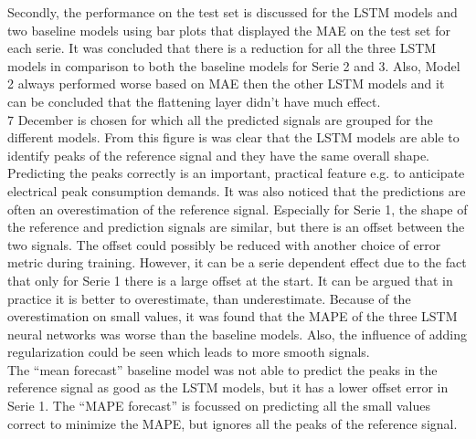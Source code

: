  Secondly, the performance on the test set is discussed for the LSTM models and two baseline models using bar plots that displayed the MAE on the test set for each serie. It was concluded that there is a reduction for all the three LSTM models in comparison to both the baseline models for Serie 2 and 3. Also, Model 2 always performed worse based on MAE then the other LSTM models and it can be concluded that the flattening layer didn't have much effect.\\ 
 $ 7 $ December is chosen for which all the predicted signals are grouped for the different models. From this figure is was clear that the LSTM models are able to identify peaks of the reference signal and they have the same overall shape. Predicting the peaks correctly is an important, practical feature e.g. to anticipate electrical peak consumption demands. It was also noticed that the predictions are often an overestimation of the reference signal. Especially for Serie 1, the shape of the reference and prediction signals are similar, but there is an offset between the two signals. The offset could possibly be reduced with another choice of error metric during training. However, it can be a serie dependent effect due to the fact that only for Serie 1 there is a large offset at the start. It can be argued that in practice it is better to overestimate, than underestimate. Because of the overestimation on small values, it was found that the MAPE of the three LSTM neural networks was worse than the baseline models. Also, the influence of adding regularization could be seen which leads to more smooth signals.\\
 
The ``mean forecast'' baseline model was not able to predict the peaks in the reference signal as good as the LSTM models, but it has a lower offset error in Serie 1. The ``MAPE forecast'' is focussed on predicting all the small values correct to minimize the MAPE, but ignores all the peaks of the reference signal.
 


